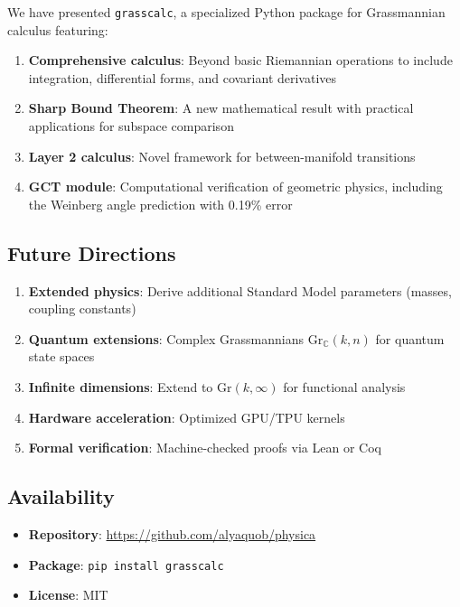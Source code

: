\documentclass[11pt,a4paper]{article}
\newcommand{\Gr}{\mathrm{Gr}}
\newcommand{\C}{\mathbb{C}}
\begin{document}
We have presented \texttt{grasscalc}, a specialized Python package for Grassmannian calculus featuring:

\begin{enumerate}
    \item \textbf{Comprehensive calculus}: Beyond basic Riemannian operations to include integration, differential forms, and covariant derivatives

    \item \textbf{Sharp Bound Theorem}: A new mathematical result with practical applications for subspace comparison

    \item \textbf{Layer 2 calculus}: Novel framework for between-manifold transitions

    \item \textbf{GCT module}: Computational verification of geometric physics, including the Weinberg angle prediction with 0.19\% error
\end{enumerate}

\subsection{Future Directions}

\begin{enumerate}
    \item \textbf{Extended physics}: Derive additional Standard Model parameters (masses, coupling constants)

    \item \textbf{Quantum extensions}: Complex Grassmannians $\Gr_\C(k,n)$ for quantum state spaces

    \item \textbf{Infinite dimensions}: Extend to $\Gr(k,\infty)$ for functional analysis

    \item \textbf{Hardware acceleration}: Optimized GPU/TPU kernels

    \item \textbf{Formal verification}: Machine-checked proofs via Lean or Coq
\end{enumerate}

\subsection{Availability}

\begin{itemize}
    \item \textbf{Repository}: \url{https://github.com/alyaquob/physica}
    \item \textbf{Package}: \texttt{pip install grasscalc}
    \item \textbf{License}: MIT
\end{itemize}
\end{document}
